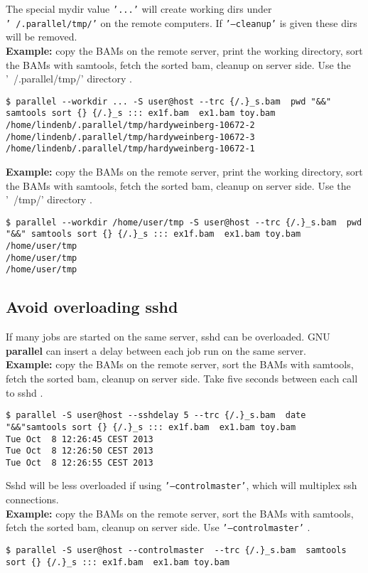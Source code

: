 \documentclass{article}
\newcommand{\example}[1]{
\textbf{Example: } {\color[rgb]{0,0,1} #1 } .
}
\newcommand{\cmdoption}[1]{\texttt{'#1'}}
\def\prl{\textbf{parallel}}
\begin{document}
The special mydir value \cmdoption{...} will create working dirs under \cmdoption{~/.parallel/tmp/} on the remote computers. If \cmdoption{--cleanup} is given these dirs will be removed.\\

\example{copy the BAMs on the remote server, print the working directory, sort the BAMs with samtools, fetch the sorted bam, cleanup on server side. Use the '~/.parallel/tmp/' directory}
\begin{lstlisting}
$ parallel --workdir ... -S user@host --trc {/.}_s.bam  pwd "&&" samtools sort {} {/.}_s ::: ex1f.bam  ex1.bam toy.bam
/home/lindenb/.parallel/tmp/hardyweinberg-10672-2
/home/lindenb/.parallel/tmp/hardyweinberg-10672-3
/home/lindenb/.parallel/tmp/hardyweinberg-10672-1
\end{lstlisting}

\example{copy the BAMs on the remote server, print the working directory, sort the BAMs with samtools, fetch the sorted bam, cleanup on server side. Use the '~/tmp/' directory}
\begin{lstlisting}
$ parallel --workdir /home/user/tmp -S user@host --trc {/.}_s.bam  pwd "&&" samtools sort {} {/.}_s ::: ex1f.bam  ex1.bam toy.bam
/home/user/tmp
/home/user/tmp
/home/user/tmp
\end{lstlisting}


\subsection{Avoid overloading sshd}
If many jobs are started on the same server, sshd can be overloaded. GNU \prl{} can insert a delay between each job run on the same server.\\
\example{copy the BAMs on the remote server, sort the BAMs with samtools, fetch the sorted bam, cleanup on server side. Take five seconds between each call to sshd}
\begin{lstlisting}
$ parallel -S user@host --sshdelay 5 --trc {/.}_s.bam  date "&&"samtools sort {} {/.}_s ::: ex1f.bam  ex1.bam toy.bam
Tue Oct  8 12:26:45 CEST 2013
Tue Oct  8 12:26:50 CEST 2013
Tue Oct  8 12:26:55 CEST 2013
\end{lstlisting}
Sshd will be less overloaded if using \cmdoption{--controlmaster}, which will multiplex ssh connections.\\
\example{copy the BAMs on the remote server, sort the BAMs with samtools, fetch the sorted bam, cleanup on server side. Use \cmdoption{--controlmaster} }
\begin{lstlisting}
$ parallel -S user@host --controlmaster  --trc {/.}_s.bam  samtools sort {} {/.}_s ::: ex1f.bam  ex1.bam toy.bam
\end{lstlisting}
\end{document}
